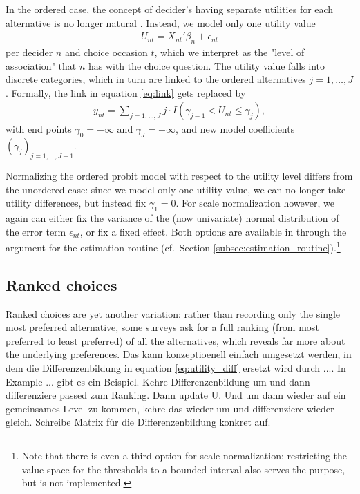\documentclass[article,shortnames]{jss}
\newcommand{\fct}[1]{\code{#1()}}
\begin{document}
In the ordered case, the concept of decider's having separate utilities for each alternative is no longer natural \citep[Ch.\ 7.4]{Train:2009}. Instead, we model only one utility value
\begin{align*}
  U_{nt} = X_{nt}'\beta_n + \epsilon_{nt}
\end{align*}
per decider $n$ and choice occasion $t$, which we interpret as the "level of association" that $n$ has with the choice question. The utility value falls into discrete categories, which in turn are linked to the ordered alternatives $j=1,\dots,J$. Formally, the link in equation \eqref{eq:link} gets replaced by
\begin{align*}
   y_{nt} = \sum_{j = 1,\dots,J} j \cdot I(\gamma_{j-1} < U_{nt} \leq \gamma_{j}),
\end{align*}
with end points $\gamma_0 = -\infty$ and $\gamma_J = +\infty$, and new model coefficients $(\gamma_j)_{j=1,\dots,J-1}$.

Normalizing the ordered probit model with respect to the utility level differs from the unordered case: since we model only one utility value, we can no longer take utility differences, but instead fix $\gamma_1 = 0$. For scale normalization however, we again can either fix the variance of the (now univariate) normal distribution of the error term $\epsilon_{nt}$, or fix a fixed effect. Both options are available in  through the  argument for the estimation routine \fct{fit\_model} (cf.\ Section \ref{subsec:estimation_routine}).\footnote{Note that there is even a third option for scale normalization: restricting the value space for the thresholds to a bounded interval also serves the purpose, but is not implemented.}

\subsection{Ranked choices} \label{subsec:ranked_choices}

Ranked choices are yet another variation: rather than recording only the single most preferred alternative, some surveys ask for a full ranking (from most preferred to least preferred) of all the alternatives, which reveals far more about the underlying preferences. Das kann konzeptioenell einfach umgesetzt werden, in dem die Differenzenbildung in equation \eqref{eq:utility_diff} ersetzt wird durch .... In Example ... gibt es ein Beispiel. Kehre Differenzenbildung um und dann differenziere passed zum Ranking. Dann update U. Und um dann wieder auf ein gemeinsames Level zu kommen, kehre das wieder um und differenziere wieder gleich. Schreibe Matrix für die Differenzenbildung konkret auf.
\end{document}
